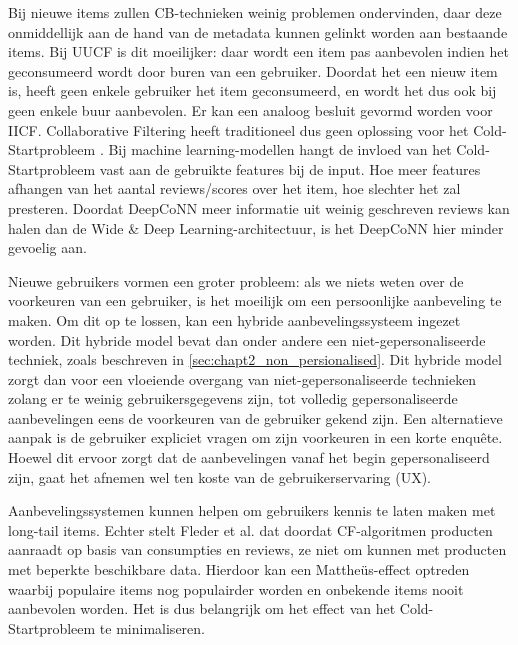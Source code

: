 Bij nieuwe items zullen CB-technieken weinig problemen ondervinden, daar deze onmiddellijk aan de hand van de metadata kunnen gelinkt worden aan bestaande items. Bij UUCF is dit moeilijker: daar wordt een item pas aanbevolen indien het geconsumeerd wordt door buren van een gebruiker. Doordat het een nieuw item is, heeft geen enkele gebruiker het item geconsumeerd, en wordt het dus ook bij geen enkele buur aanbevolen. Er kan een analoog besluit gevormd worden voor IICF. Collaborative Filtering heeft traditioneel dus geen oplossing voor het Cold-Startprobleem \cite{recsys_diversity}.  Bij machine learning-modellen hangt de invloed van het Cold-Startprobleem vast aan de gebruikte features bij de input. Hoe meer features afhangen van het aantal reviews/scores over het item, hoe slechter het zal presteren. Doordat DeepCoNN meer informatie uit weinig geschreven reviews kan halen dan de Wide \& Deep Learning-architectuur, is het DeepCoNN hier minder gevoelig aan. \cite{deepconn}

Nieuwe gebruikers vormen een groter probleem: als we niets weten over de voorkeuren van een gebruiker, is het moeilijk om een persoonlijke aanbeveling te maken. Om dit op te lossen, kan een hybride aanbevelingssysteem ingezet worden. Dit hybride model bevat dan onder andere een niet-gepersonaliseerde techniek, zoals beschreven in \autoref{sec:chapt2_non_persionalised}. Dit hybride model zorgt dan voor een vloeiende overgang van niet-gepersonaliseerde technieken zolang er te weinig gebruikersgegevens zijn, tot volledig gepersonaliseerde aanbevelingen eens de voorkeuren van de gebruiker gekend zijn. Een alternatieve aanpak is de gebruiker expliciet vragen om zijn voorkeuren in een korte enquête. Hoewel dit ervoor zorgt dat de aanbevelingen vanaf het begin gepersonaliseerd zijn, gaat het afnemen wel ten koste van de gebruikerservaring (UX).

Aanbevelingssystemen kunnen helpen om gebruikers kennis te laten maken met long-tail items. Echter stelt Fleder et al. \cite{recsys_diversity} dat doordat CF-algoritmen producten aanraadt op basis van consumpties en reviews, ze niet om kunnen met producten met beperkte beschikbare data. Hierdoor kan een Mattheüs-effect optreden waarbij populaire items nog populairder worden en onbekende items nooit aanbevolen worden. Het is dus belangrijk om het effect van het Cold-Startprobleem te minimaliseren.

